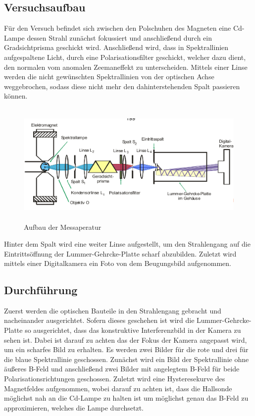 \subsection{Versuchsaufbau}
Für den Versuch befindet sich zwischen den Polschuhen des Magneten eine Cd-Lampe dessen Strahl zunächst fokussiert und anschließend durch ein Gradsichtprisma geschickt wird. Anschließend wird, dass in Spektrallinien aufgespaltene Licht, durch eine Polarisationsfilter geschickt, welcher dazu dient, den normalen vom anomalen Zeemaneffekt zu unterscheiden. Mittels einer Linse werden die nicht gewünschten Spektrallinien von der optischen Achse weggebrochen, sodass diese nicht mehr den dahinterstehenden Spalt passieren können.
\begin{figure}[H]
  \centering
  \includegraphics[height=6cm]{Bilder/Aufbau.png}
  \caption{Aufbau der Messaperatur \cite{V27}}
\end{figure}
Hinter dem Spalt wird eine weiter Linse aufgestellt, um den Strahlengang auf die Eintrittsöffnung der Lummer-Gehrcke-Platte scharf abzubilden. Zuletzt wird mittels einer Digitalkamera ein Foto von dem Beugungsbild aufgenommen.

\subsection{Durchführung}
Zuerst werden die optischen Bauteile in den Strahlengang gebracht und nacheinander ausgerichtet. Sofern dieses geschehen ist wird die Lummer-Gehrcke-Platte so ausgerichtet, dass das konstruktive Interferenzbild in der Kamera zu sehen ist. Dabei ist darauf zu achten das der Fokus der Kamera angepasst wird, um ein scharfes Bild zu erhalten. Es werden zwei Bilder für die rote und drei für die blaue Spektrallinie geschossen. Zunächst wird ein Bild der Spektrallinie ohne äußeres B-Feld und anschließend zwei Bilder mit angelegtem B-Feld für beide Polarisationsrichtungen geschossen. Zuletzt wird eine Hysteresekurve des Magnetfeldes aufgenommen, wobei darauf zu achten ist, dass die Hallsonde möglichst nah an die Cd-Lampe zu halten ist um möglichst genau das B-Feld zu approximieren, welches die Lampe durchsetzt.
